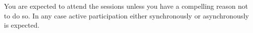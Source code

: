         You are expected to attend the sessions unless you have a compelling reason not to do so. In any case active participation either synchronously or asynchronously is expected.
    
